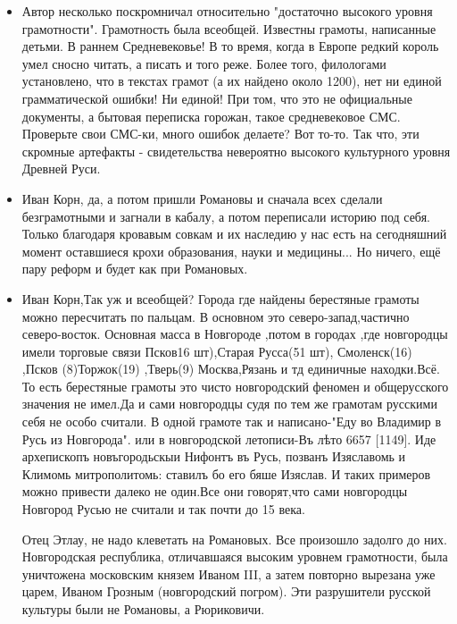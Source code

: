 \begin{itemize}

\item {}

Автор несколько поскромничал относительно "достаточно высокого уровня
грамотности". Грамотность была всеобщей. Известны грамоты,
написанные детьми. В раннем Средневековье! В то время, когда в
Европе редкий король умел сносно читать, а писать и того реже.
Более того, филологами установлено, что в текстах грамот (а их
найдено около 1200), нет ни единой грамматической ошибки! Ни
единой! При том, что это не официальные документы, а бытовая
переписка горожан, такое средневековое СМС. Проверьте свои
СМС-ки, много ошибок делаете? Вот то-то. Так что, эти скромные
артефакты - свидетельства невероятно высокого культурного
уровня Древней Руси.

\item {}

Иван Корн, да, а потом пришли Романовы и сначала всех сделали безграмотными и
загнали в кабалу, а потом переписали историю под себя. Только
благодаря кровавым совкам и их наследию у нас есть на
сегодняшний момент оставшиеся крохи образования, науки и
медицины... Но ничего, ещё пару реформ и будет как при
Романовых.

\item {}

Иван Корн,Так уж и всеобщей? Города где найдены берестяные грамоты можно
пересчитать по пальцам. В основном это северо-запад,частично
северо-восток. Основная масса в Новгороде ,потом в городах ,где
новгородцы имели торговые связи Псков16 шт),Старая Русса(51
шт), Смоленск(16) ,Псков (8)Торжок(19) ,Тверь(9) Москва,Рязань
и тд единичные находки.Всё. То есть берестяные грамоты это
чисто новгородский феномен и общерусского значения не имел.Да и
сами новгородцы судя по тем же грамотам русскими себя не особо
считали. В одной грамоте так и написано-"Еду во Владимир в Русь
из Новгорода". или в новгородской летописи-Въ лѣто 6657 [1149].
Иде архепископъ новъгородьскыи Нифонтъ въ Русь, позванъ
Изяславомь и Климомь митрополитомь: ставилъ бо его бяше
Изяслав. И таких примеров можно привести далеко не один.Все они
говорят,что сами новгородцы Новгород Русью не считали и так
почти до 15 века.


Отец Этлау, не надо клеветать на Романовых. Все произошло задолго до них.
Новгородская республика, отличавшаяся высоким уровнем
грамотности, была уничтожена московским князем Иваном III, а
затем повторно вырезана уже царем, Иваном Грозным (новгородский
погром). Эти разрушители русской культуры были не Романовы, а
Рюриковичи.


\end{itemize}
